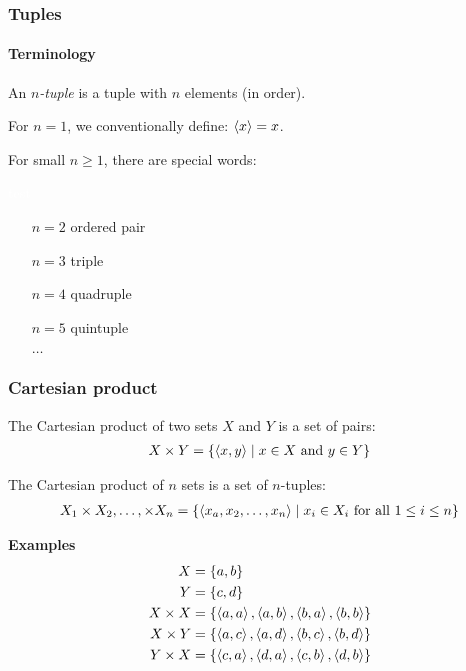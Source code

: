 \documentclass[fleqn,10pt,serif,xcolor=svgnames,xcolor=table,aspectratio=169,handout]{beamer}
\begin{document}
\begin{frame}
  \frametitle{Tuples}
  \framesubtitle{Terminology}

  An \textit{$n$-tuple} is a tuple with $n$ elements (in order).


  For $n=1$, we conventionally define: $\left \langle x\right\rangle = x$.

  For small $n \ge 1$, there are special words:

  \medskip

  \begin{minipage}{0.15\linewidth}
    \textcolor{white}{test}
  \end{minipage}
  \begin{minipage}{0.4\linewidth}
    \begin{itemize}
      \item[$n=2$] ordered pair
      \item[$n=3$] triple
      \item[$n=4$] quadruple
      \item[$n=5$] quintuple
      \item[] $\dots$
    \end{itemize}
  \end{minipage}
\end{frame}

\begin{frame}
  \frametitle{Cartesian product}

  The Cartesian product of two sets $X$ and $Y$ is a set of pairs:
  \begin{align*}
    X \times Y = \left\{\left \langle x,y\right\rangle \mid x \in X \text{ and } y \in Y\right\}
  \end{align*}

  \bigskip \pause

  The Cartesian product of $n$ sets is a set of $n$-tuples:
  \begin{align*}
    X_{1} \times X_{2}, \dots, \times X_{n} = \left\{\left \langle x_{a},x_{2}, \dots, x_{n}\right\rangle \mid x_{i} \in X_{i} \text{ for all } 1 \le i \le n\right\}
  \end{align*}


  \bigskip \pause

  \textbf{{\color{themecolor}Examples}}\\
  \begin{align*}
    X &= \left\{a,b\right\} \\
    Y &= \left\{c,d\right\} \\
    X \times X & = \left\{\left \langle a,a\right\rangle, \left \langle a,b\right\rangle, \left \langle b,a\right\rangle, \left \langle b,b\right\rangle\right\} \\
    X \times Y & = \left\{\left \langle a,c\right\rangle, \left \langle a,d\right\rangle, \left \langle b,c\right\rangle, \left \langle b,d\right\rangle\right\} \\
    Y \times X & = \left\{\left \langle c,a\right\rangle, \left \langle d,a\right\rangle, \left \langle c,b\right\rangle, \left \langle d,b\right\rangle\right\} \\
  \end{align*}

\end{frame}
\end{document}
